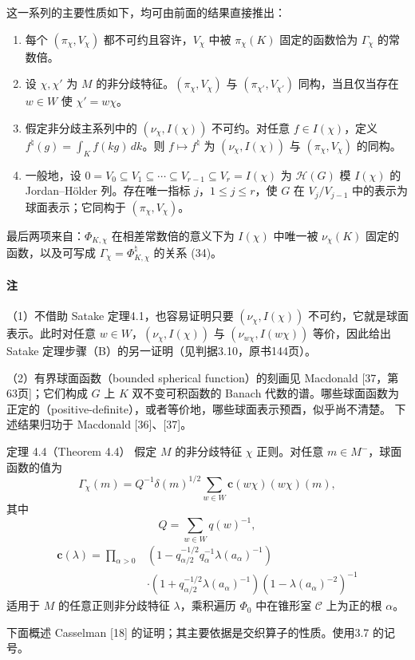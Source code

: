 这一系列的主要性质如下，均可由前面的结果直接推出：
\begin{enumerate}
\item[(a)] 每个 $(\pi_\chi,V_\chi)$ 都不可约且容许，$V_\chi$ 中被 $\pi_\chi(K)$ 固定的函数恰为 $\Gamma_\chi$ 的常数倍。
\item[(b)] 设 $\chi,\chi'$ 为 $M$ 的非分歧特征。$(\pi_\chi,V_\chi)$ 与 $(\pi_{\chi'},V_{\chi'})$ 同构，当且仅当存在 $w\in W$ 使 $\chi'=w\chi$。
\item[(c)] 假定非分歧主系列中的 $(\nu_\chi,I(\chi))$ 不可约。对任意 $f\in I(\chi)$，定义 $f^\natural(g)=\int_K f(kg)\,dk$。则 $f\mapsto f^\natural$ 为 $(\nu_\chi,I(\chi))$ 与 $(\pi_\chi,V_\chi)$ 的同构。
\item[(d)] 一般地，设 $0=V_0\subseteq V_1\subseteq\cdots\subseteq V_{r-1}\subseteq V_r=I(\chi)$ 为 $\mathcal H(G)$ 模 $I(\chi)$ 的 Jordan--Hölder 列。存在唯一指标 $j$，$1\leq j\leq r$，使 $G$ 在 $V_j/V_{j-1}$ 中的表示为球面表示；它同构于 $(\pi_\chi,V_\chi)$。
\end{enumerate}
最后两项来自：$\Phi_{K,\chi}$ 在相差常数倍的意义下为 $I(\chi)$ 中唯一被 $\nu_\chi(K)$ 固定的函数，以及可写成 $\Gamma_\chi=\Phi_{K,\chi}^\natural$ 的关系 (34)。
\paragraph*{注}
（1）不借助 Satake 定理4.1，也容易证明只要 $(\nu_\chi,I(\chi))$ 不可约，它就是球面表示。此时对任意 $w\in W$，$(\nu_\chi,I(\chi))$ 与 $(\nu_{w\chi},I(w\chi))$ 等价，因此给出 Satake 定理步骤（B）的另一证明（见判据3.10，原书144页）。

（2）有界球面函数（bounded spherical function）的刻画见 Macdonald [37，第63页]；它们构成 $G$ 上 $K$ 双不变可积函数的 Banach 代数的谱。哪些球面函数为正定的（positive-definite），或者等价地，哪些球面表示预酉，似乎尚不清楚。
下述结果归功于 Macdonald [36]、[37]。
\begin{originaltheorem}{定理 4.4（Theorem 4.4）}
假定 $M$ 的非分歧特征 $\chi$ 正则。对任意 $m\in M^-$，球面函数的值为
\[
\Gamma_\chi(m)=Q^{-1}\delta(m)^{1/2}\sum_{w\in W}\mathbf c(w\chi)(w\chi)(m),\tag{42}
\]
其中
\[
Q=\sum_{w\in W}q(w)^{-1},\tag{43}
\]
\[
\begin{aligned}
\mathbf c(\lambda)=\prod_{\alpha>0}&(1-q_{\alpha/2}^{-1/2}q_\alpha^{-1}\lambda(a_\alpha)^{-1})\\
&\cdot(1+q_{\alpha/2}^{-1/2}\lambda(a_\alpha)^{-1})(1-\lambda(a_\alpha)^{-2})^{-1}
\end{aligned}\tag{44}
\]
适用于 $M$ 的任意正则非分歧特征 $\lambda$，乘积遍历 $\Phi_0$ 中在锥形室 $\mathcal C$ 上为正的根 $\alpha$。
\end{originaltheorem}
下面概述 Casselman [18] 的证明；其主要依据是交织算子的性质。使用3.7 的记号。

